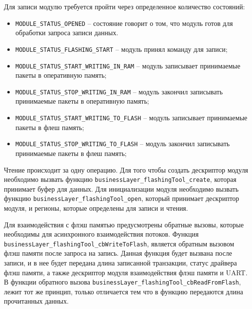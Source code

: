 Для записи модулю требуется пройти через определенное количество состояний: 

\begin{itemize}
    \item \lstinline|MODULE_STATUS_OPENED| -- состояние говорит о том, что модуль готов для обработки запроса записи данных.
    \item \lstinline|MODULE_STATUS_FLASHING_START| -- модуль принял команду для записи;
    \item \lstinline|MODULE_STATUS_START_WRITING_IN_RAM| -- модуль записывает принимаемые пакеты в оперативную память;
    \item \lstinline|MODULE_STATUS_STOP_WRITING_IN_RAM| -- модуль закончил записывать принимаемые пакеты в оперативную память;
    \item \lstinline|MODULE_STATUS_START_WRITING_TO_FLASH| -- модуль записывает принимаемые пакеты в флеш память;
    \item \lstinline|MODULE_STATUS_STOP_WRITING_TO_FLASH| -- модуль закончил записывать принимаемые пакеты в флеш память;
\end{itemize}

Чтение происходит за одну операцию.
Для того чтобы создать дескриптор модуля необходимо вызвать функцию \lstinline|businessLayer_flashingTool_create|, которая принимает буфер для данных. Для инициализации модуля
необходимо вызвать функцию \lstinline|businessLayer_flashingTool_open|, который принимает дескриптор модуля, и регионы, которые определены для
записи и чтения.

Для взаимодействия с флэш памятью предусмотрены обратные вызовы, которые необходимы для асинхронного взаимодействия потоков. 
Функция \lstinline|businessLayer_flashingTool_cbWriteToFlash|, является обратным вызовом флэш памяти после запроса на запись.
Данная функция будет вызвана после записи, и в нее будет передана длина записанной транзакции, статус драйвера флэш памяти, а
также дескриптор модуля взаимодействия флэш памяти и UART. В функции обратного вызова \lstinline|businessLayer_flashingTool_cbReadFromFlash|,
лежит тот же принцип, только отличается тем что в функцию передаются длина прочитанных данных.

